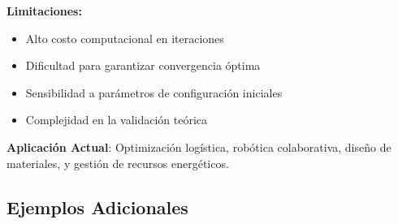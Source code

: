 \documentclass[14pt]{extarticle}
\begin{document}
  \textbf{Limitaciones:}
  \begin{itemize}
    \item Alto costo computacional en iteraciones
    \item Dificultad para garantizar convergencia óptima
    \item Sensibilidad a parámetros de configuración iniciales
    \item Complejidad en la validación teórica
  \end{itemize}

  \textbf{Aplicación Actual}: Optimización logística, robótica colaborativa, diseño de materiales, y gestión de recursos energéticos.

  \subsection*{Ejemplos Adicionales}
\end{document}
